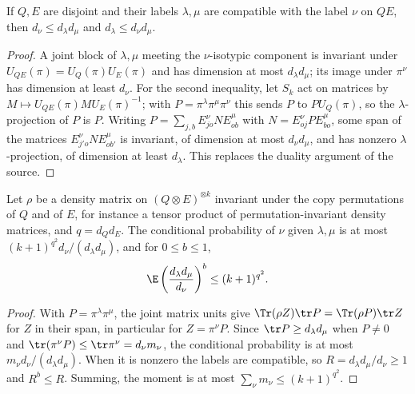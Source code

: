 \begin{theorem}
    \label{thm:schur_label_merge_dimensions}
    \leanok
    If $Q,E$ are disjoint and their labels $\lambda,\mu$ are compatible with
    the label $\nu$ on $QE$, then $d_\nu\le d_\lambda d_\mu$ and
    $d_\lambda\le d_\nu d_\mu$.
\end{theorem}

\begin{proof}\leanok
    A joint block of $\lambda,\mu$ meeting the $\nu$-isotypic component is
    invariant under $U_{QE}(\pi)=U_Q(\pi)U_E(\pi)$ and has dimension at most
    $d_\lambda d_\mu$; its image under $\pi^\nu$ has dimension at least
    $d_\nu$. For the second inequality, let $S_k$ act on matrices by
    $M\mapsto U_{QE}(\pi)MU_E(\pi)^{-1}$; with $P=\pi^\lambda\pi^\mu\pi^\nu$
    this sends $P$ to $PU_Q(\pi)$, so the $\lambda$-projection of $P$ is $P$.
    Writing $P=\sum_{j,b}E^\nu_{jo}NE^\mu_{ob}$ with
    $N=E^\nu_{oj}PE^\mu_{bo}$, some span of the matrices
    $E^\nu_{j'o}NE^\mu_{ob'}$ is invariant, of dimension at most
    $d_\nu d_\mu$, and has nonzero $\lambda$-projection, of dimension at least
    $d_\lambda$. This replaces the duality argument of the source.
\end{proof}

\begin{theorem}
    \label{thm:schur_label_merge_moment}
    \leanok
    Let $\rho$ be a density matrix on $(Q\otimes E)^{\otimes k}$ invariant
    under the copy permutations of $Q$ and of $E$, for instance a tensor
    product of permutation-invariant density matrices, and $q=d_Qd_E$. The
    conditional probability of $\nu$ given $\lambda,\mu$ is at most
    $(k+1)^{q^2}d_\nu/(d_\lambda d_\mu)$, and for $0\le b\le1$,
    \[
        \E\left(\frac{d_\lambda d_\mu}{d_\nu}\right)^b\le(k+1)^{q^2}.
    \]
\end{theorem}

\begin{proof}\leanok
    With $P=\pi^\lambda\pi^\mu$, the joint matrix units give
    $\Tr(\rho Z)\tr P=\Tr(\rho P)\tr Z$ for $Z$ in their span, in particular
    for $Z=\pi^\nu P$. Since $\tr P\ge d_\lambda d_\mu$ when $P\ne0$ and
    $\tr(\pi^\nu P)\le\tr\pi^\nu=d_\nu m_\nu$, the conditional probability is
    at most $m_\nu d_\nu/(d_\lambda d_\mu)$. When it is nonzero the labels are
    compatible, so $R=d_\lambda d_\mu/d_\nu\ge1$ and $R^b\le R$. Summing,
    the moment is at most $\sum_\nu m_\nu\le(k+1)^{q^2}$.
\end{proof}

